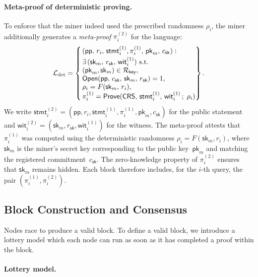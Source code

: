 \paragraph{Meta-proof of deterministic proving.}
To enforce that the miner indeed used the prescribed randomness $\rho_i$, the miner additionally generates a \emph{meta-proof} $\pi_i^{(2)}$ for the language:
\[
\mathcal{L}_{\text{det}} = \left\{\,
  \begin{array}{@{}l@{}}
    (\mathsf{pp},\, r_i,\, \mathsf{stmt}_i^{(1)},\pi_i^{(1)},\, \mathsf{pk}_m,\, c_{\mathsf{sk}}):\\[0.2em]
    \exists\, (\mathsf{sk}_m,\, r_{\mathsf{sk}},\, \mathsf{wit}_i^{(1)}) \ \text{s.t.} \\
    (\mathsf{pk}_m, \mathsf{sk}_m) \in \mathcal{R}_{\mathsf{key}}, \\
    \mathsf{Open}(\mathsf{pp},\, c_{\mathsf{sk}},\, \mathsf{sk}_m,\, r_{\mathsf{sk}}) = 1, \\
    \rho_i = F(\mathsf{sk}_m,\, r_i), \\
    \pi_i^{(1)} = \mathsf{Prove}(\mathsf{CRS},\, \mathsf{stmt}_i^{(1)},\, \mathsf{wit}_i^{(1)}\,;\; \rho_i)
  \end{array}
\right\}.
\]
We write $\mathsf{stmt}_i^{(2)} = (\mathsf{pp}, r_i, \mathsf{stmt}_i^{(1)}, \pi_i^{(1)}, \mathsf{pk}_m, c_{\mathsf{sk}})$ for the public statement and $\mathsf{wit}_i^{(2)} = (\mathsf{sk}_m, r_{\mathsf{sk}}, \mathsf{wit}_i^{(1)})$ for the witness.
The meta-proof attests that $\pi_i^{(1)}$ was computed using the deterministic randomness $\rho_i = F(\mathsf{sk}_m, r_i)$, where $\mathsf{sk}_m$ is the miner's secret key corresponding to the public key~$\mathsf{pk}_m$ and matching the registered commitment~$c_{\mathsf{sk}}$. The zero-knowledge property of $\pi_i^{(2)}$ ensures that $\mathsf{sk}_m$ remains hidden. Each block therefore includes, for the $i$-th query, the pair $(\pi_i^{(1)}, \pi_i^{(2)})$.

\subsection{Block Construction and Consensus}

Nodes race to produce a valid block. To define a valid block, we introduce a lottery model which each node can run as soon as it has completed a proof within the block.

\paragraph{Lottery model.}

